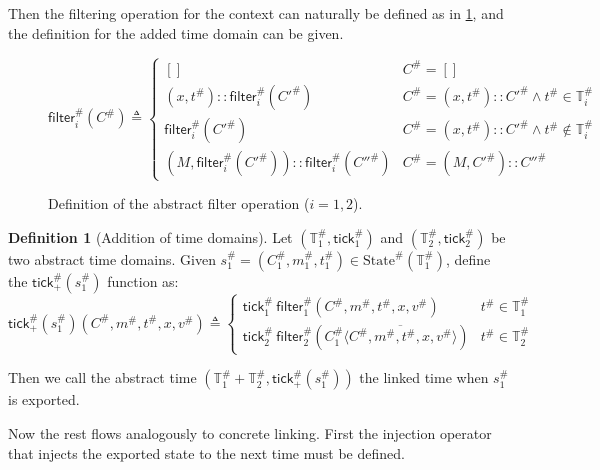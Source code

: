 \documentclass[acmsmall,review]{acmart}\settopmatter{printfolios=true,printccs=false,printacmref=false}
\theoremstyle{definition}
\newtheorem{definition}{Definition}[section]
\newcommand*{\cons}{::}
\newcommand*{\A}[1]{{#1}^{\#}}
\newcommand*{\Time}{\mathbb{T}}
\newcommand*{\ATime}{\A{\Time}}
\newcommand*{\mem}{m}
\newcommand*{\AState}[1]{\A{\text{State}}({#1})}
\newcommand*{\tick}{\mathsf{tick}}
\newcommand*{\delete}[2]{{#1}\overline{\langle{#2}\rangle}}
\newcommand*{\filter}{\mathsf{filter}}
\begin{document}
Then the filtering operation for the context can naturally be defined as in \ref{fig:absfilter}, and the definition for the added time domain can be given.
\begin{figure}[h!]
  \footnotesize
  \[
    \A\filter_i(\A{C})\triangleq
    \begin{cases}
      []                                               & \A{C}=[]                                                \\
      (x,\A{t})\cons\A\filter_i(\A{C'})                & \A{C}=(x,\A{t})\cons \A{C'}\wedge \A{t}\in\A\Time_i     \\
      \A\filter_i(\A{C'})                              & \A{C}=(x,\A{t})\cons \A{C'}\wedge \A{t}\not\in\A\Time_i \\
      (M,\A\filter_i(\A{C'}))\cons\A\filter_i(\A{C''}) & \A{C}=(M, \A{C'})\cons \A{C''}
    \end{cases}
  \]
  \caption{Definition of the abstract filter operation ($i=1,2$).}
  \label{fig:absfilter}
\end{figure}

\begin{definition}[Addition of time domains]
  Let $(\ATime_1,\A\tick_1)$ and $(\ATime_2,\A\tick_2)$ be two abstract time domains.
  Given $\A{s}_1=(\A{C}_1,\A\mem_1,\A{t}_1)\in\AState{\ATime_1}$, define the $\A{\tick}_+(\A{s}_1)$ function as:
  \[
    \A\tick_{+}(\A{s}_1)(\A{C},\A\mem,\A{t},x,\A{v})\triangleq
    \begin{cases}
      \A{\tick}_1\:\A\filter_1(\A{C},\A\mem,\A{t},x,\A{v})                   & \A{t}\in\ATime_1 \\
      \A{\tick}_2\:\A\filter_2(\delete{\A{C}_1}{\A{C},\A\mem,\A{t},x,\A{v}}) & \A{t}\in\ATime_2
    \end{cases}
  \]

  Then we call the abstract time $(\ATime_1+\ATime_2,\A\tick_{+}(\A{s}_1))$ the linked time when $\A{s}_1$ is exported.
\end{definition}

Now the rest flows analogously to concrete linking.
First the injection operator that injects the exported state to the next time must be defined.
\end{document}
